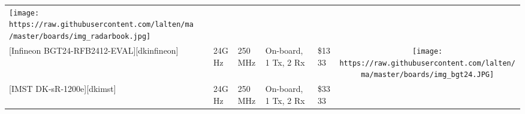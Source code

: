 \begin{longtable}[]{@{}llllllc@{}}
\begin{minipage}[t]{0.10\columnwidth}
\texttt{[image: https://raw.githubusercontent.com/lalten/ma/master/boards/img\_radarbook.jpg]}\strut
\end{minipage}\tabularnewline
\begin{minipage}[t]{0.09\columnwidth}\raggedright\strut
{[}Infineon BGT24-RFB2412-EVAL{]}{[}dkinfineon{]}\strut
\end{minipage} & \begin{minipage}[t]{0.13\columnwidth}\raggedright\strut
\strut
\end{minipage} & \begin{minipage}[t]{0.09\columnwidth}\raggedright\strut
24GHz\strut
\end{minipage} & \begin{minipage}[t]{0.11\columnwidth}\raggedright\strut
250MHz\strut
\end{minipage} & \begin{minipage}[t]{0.10\columnwidth}\raggedright\strut
On-board, 1 Tx, 2 Rx\strut
\end{minipage} & \begin{minipage}[t]{0.15\columnwidth}\raggedright\strut
\$1333\strut
\end{minipage} & \begin{minipage}[t]{0.10\columnwidth}\centering\strut
\texttt{[image: https://raw.githubusercontent.com/lalten/ma/master/boards/img\_bgt24.JPG]}\strut
\end{minipage}\tabularnewline
\begin{minipage}[t]{0.09\columnwidth}\raggedright\strut
{[}IMST DK-sR-1200e{]}{[}dkimst{]}\strut
\end{minipage} & \begin{minipage}[t]{0.13\columnwidth}\raggedright\strut
\strut
\end{minipage} & \begin{minipage}[t]{0.09\columnwidth}\raggedright\strut
24GHz\strut
\end{minipage} & \begin{minipage}[t]{0.11\columnwidth}\raggedright\strut
250MHz\strut
\end{minipage} & \begin{minipage}[t]{0.10\columnwidth}\raggedright\strut
On-board, 1 Tx, 2 Rx\strut
\end{minipage} & \begin{minipage}[t]{0.15\columnwidth}\raggedright\strut
\$3333\strut
\end{minipage} & \begin{minipage}[t]{0.10\columnwidth}\centering\strut

\end{minipage}
\end{longtable}
